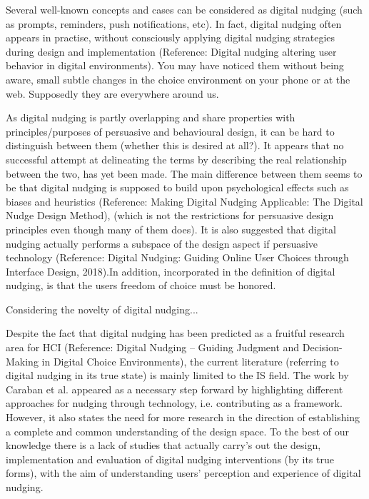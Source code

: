 Several well-known concepts and cases can be considered as digital nudging (such as prompts, reminders, push notifications, etc). In fact, digital nudging often appears in practise, without consciously applying digital nudging strategies during design and implementation (Reference: Digital nudging altering user behavior in digital environments). You may have noticed them without being aware, small subtle changes in the choice environment on your phone or at the web. Supposedly they are everywhere around us. 

As digital nudging is partly overlapping and share properties with principles/purposes of persuasive and behavioural design, it can be hard to distinguish between them (whether this is desired at all?). It appears that no successful attempt at delineating the terms by describing the real relationship between the two, has yet been made. The main difference between them seems to be that digital nudging is supposed to build upon psychological effects such as biases and heuristics (Reference: Making Digital Nudging Applicable: The Digital Nudge Design Method), (which is not the restrictions for persuasive design principles even though many of them does). It is also suggested that digital nudging actually performs a subspace of the design aspect if persuasive technology (Reference: Digital Nudging: Guiding Online User Choices through Interface Design, 2018).In addition, incorporated in the definition of digital nudging, is that the users freedom of choice must be honored. 


Considering the novelty of digital nudging...

Despite the fact that digital nudging has been predicted as a fruitful research area for HCI (Reference: Digital Nudging – Guiding Judgment and Decision-Making in Digital Choice Environments), the current literature (referring to digital nudging in its true state) is mainly limited to the IS field. The work by Caraban et al. appeared as a necessary step forward by highlighting different approaches for nudging through technology, i.e. contributing as a framework. However, it also states the need for more research in the direction of establishing a complete and common understanding of the design space. To the best of our knowledge there is a lack of studies that actually carry's out the design, implementation and evaluation  of digital nudging interventions (by its true forms), with the aim of understanding users' perception and experience of digital nudging.


